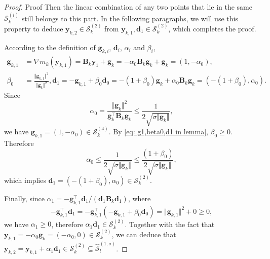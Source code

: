 \documentclass[colorlinks=true, linkcolor=blue, citecolor=blue, urlcolor=blue]{article}
\theoremstyle{plain}
\theoremstyle{definition}
\theoremstyle{remark}
\begin{document}
\begin{proof}{Proof}
Then the linear combination of any two points that lie in the same $\mathcal{S}_k^{(i)}$ still belongs to this part. In the following paragraphs, we will use this property to deduce $\bm y_{k,2}\in\mathcal{S}_k^{(2)}$ from $\bm y_{k,1},\bm d_1\in\mathcal{S}_k^{(2)}$, which completes the proof.

    According to the definition of $\bm g_{k,i}$, $\bm d_i$, $\alpha_i$ and $\beta_i$,   
    \begin{equation}\label{eq: g1,beta0,d1 in lemma}
    \begin{aligned}
        \bm{g}_{k,1}&=\nabla m_k(\bm{y}_{k,1})=\bm{B}_k\bm{y}_1+\bm{g}_k=-\alpha_0\bm{B}_k\bm{g}_k+\bm{g}_k=(1,-\alpha_0),\\       \beta_0&=\frac{\Vert\bm{g}_{k,1}\Vert^2}{\Vert\bm{g}_k\Vert^2}, 
        \bm{d}_1=-\bm{g}_{k,1}+\beta_0\bm{d}_0=-(1+\beta_0)\bm{g}_k+\alpha_0\bm{B}_k\bm{g}_k=(-(1+\beta_0),\alpha_0).
    \end{aligned}
    \end{equation}
    Since
    \[
    \alpha_0=\frac{\Vert \bm{g}_k\Vert^2}{\bm{g}_k^\top\bm{B}_k\bm{g}_k}\leq\frac{1}{2\sqrt{\sigma\Vert\bm{g}_k\Vert}},
    \]
    we have $\bm g_{k,1}=(1,-\alpha_0)\in\mathcal{S}_k^{(4)}$. By \eqref{eq: g1,beta0,d1 in lemma}, $\beta_0\geq 0$. Therefore
    \begin{equation*}
        \alpha_0\leq\frac{1}{2\sqrt{\sigma \Vert\bm g_k\Vert}}\leq \frac{(1+\beta_0)}{2\sqrt{\sigma \Vert\bm g_k\Vert}},
    \end{equation*}
which implies $\bm d_1=\left(-(1+\beta_0),\alpha_0\right)\in\mathcal{S}_k^{(2)}$.

    Finally, since 
    $\alpha_1=-\bm{g}_{k,1}^\top \bm{d}_1/(\bm{d}_1\bm{B}_k\bm{d}_1)$, where 
    \begin{equation*}
        -\bm{g}_{k,1}^\top \bm{d}_1=-\bm{g}_{k,1}^\top(-\bm{g}_{k,1}+\beta_0\bm{d}_0)=\Vert \bm{g}_{k,1}\Vert^2+0\geq 0, 
    \end{equation*}
    we have $\alpha_1\geq 0$, therefore $\alpha_1\bm d_1\in\mathcal{S}_k^{(2)}$. Together with the fact that $\bm y_{k,1}=-\alpha_0\bm g_k=(-\alpha_0,0)\in\mathcal{S}_k^{(2)}$, we can deduce that $\bm y_{k,2}=\bm y_{k,1}+\alpha_1\bm d_1\in\mathcal{S}_k^{(2)}\subseteq \hat{\mathcal{S}}_l^{(1,\sigma)}$.    
        
\end{proof}
\end{document}
